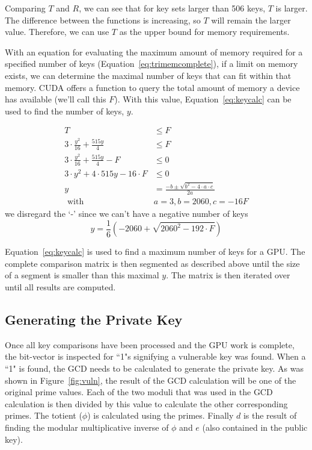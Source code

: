 \documentclass[smallextended]{svjour3}       %
\begin{document}
Comparing $T$ and $R$, we can see that for key sets larger than 506 keys, $T$
is larger. The difference between the functions is increasing, so $T$ will
remain the larger value. Therefore, we can use $T$ as the upper bound for
memory requirements. 

With an equation for evaluating the maximum amount of memory required for a
specified number of keys (Equation~\ref{eq:trimemcomplete}), if a limit on
memory exists, we can determine the maximal number of keys that can fit within
that memory. CUDA offers a function to query the total amount of memory a
device has available (we'll call this $F$). With this value,
Equation~\ref{eq:keycalc} can be used to find the number of keys, $y$.

\begin{align*}
   T & \leq F\\
   3 \cdot \frac{y^2}{16} + \frac{515y}{4} & \leq F\\
   3 \cdot \frac{y^2}{16} + \frac{515y}{4} - F & \leq 0\\
   3 \cdot y^2 + 4\cdot515y- 16 \cdot F & \leq 0\\
   y & = \frac{-b \pm \sqrt{b^2 - 4 \cdot a \cdot c}}{2a}\\
   \text{ with } & a = 3, b = 2060, c = -16F
\end{align*}
\noindent we disregard the `-' since we can't have a negative number of keys
\begin{equation}
   y = \frac{1}{6}\left(-2060 + \sqrt{2060^2 - 192 \cdot F}\right)
   \label{eq:keycalc}
\end{equation}

Equation~\ref{eq:keycalc} is used to find a maximum number of keys for a GPU.
The complete comparison matrix is then segmented as described above until the
size of a segment is smaller than this maximal $y$. The matrix is then iterated
over until all results are computed.

\subsection{Generating the Private Key}
\label{subsec:private}
Once all key comparisons have been processed and the GPU work is complete, the
bit-vector is inspected for ``1"s signifying a vulnerable key was found. When a
``1" is found, the GCD needs to be calculated to generate the private key. As
was shown in Figure~\ref{fig:vuln}, the result of the GCD calculation will be
one of the original prime values. Each of the two moduli that was used in the
GCD calculation is then divided by this value to calculate the other
corresponding primes. The totient ($\phi$) is calculated using the primes.
Finally $d$ is the result of finding the modular multiplicative inverse of
$\phi$ and $e$ (also contained in the public key).
\end{document}
